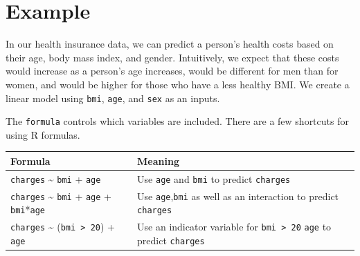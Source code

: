 \documentclass[
  openany]{book}
\begin{document}
\hypertarget{example}{%
\section{Example}\label{example}}

In our health insurance data, we can predict a person's health costs based on their age, body mass index, and gender. Intuitively, we expect that these costs would increase as a person's age increases, would be different for men than for women, and would be higher for those who have a less healthy BMI. We create a linear model using \texttt{bmi}, \texttt{age}, and \texttt{sex} as an inputs.

The \texttt{formula} controls which variables are included. There are a few shortcuts for using R formulas.

\begin{longtable}[]{@{}ll@{}}
\toprule
\begin{minipage}[b]{0.41\columnwidth}\raggedright
Formula\strut
\end{minipage} & \begin{minipage}[b]{0.53\columnwidth}\raggedright
Meaning\strut
\end{minipage}\tabularnewline
\midrule
\endhead
\begin{minipage}[t]{0.41\columnwidth}\raggedright
\texttt{charges} \textasciitilde{} \texttt{bmi} + \texttt{age}\strut
\end{minipage} & \begin{minipage}[t]{0.53\columnwidth}\raggedright
Use \texttt{age} and \texttt{bmi} to predict \texttt{charges}\strut
\end{minipage}\tabularnewline
\begin{minipage}[t]{0.41\columnwidth}\raggedright
\texttt{charges} \textasciitilde{} \texttt{bmi} + \texttt{age} + \texttt{bmi}*\texttt{age}\strut
\end{minipage} & \begin{minipage}[t]{0.53\columnwidth}\raggedright
Use \texttt{age},\texttt{bmi} as well as an interaction to predict \texttt{charges}\strut
\end{minipage}\tabularnewline
\begin{minipage}[t]{0.41\columnwidth}\raggedright
\texttt{charges} \textasciitilde{} (\texttt{bmi\ \textgreater{}\ 20}) + \texttt{age}\strut
\end{minipage} & \begin{minipage}[t]{0.53\columnwidth}\raggedright
Use an indicator variable for \texttt{bmi\ \textgreater{}\ 20} \texttt{age} to predict \texttt{charges}\strut

\end{minipage}
\end{longtable}
\end{document}
